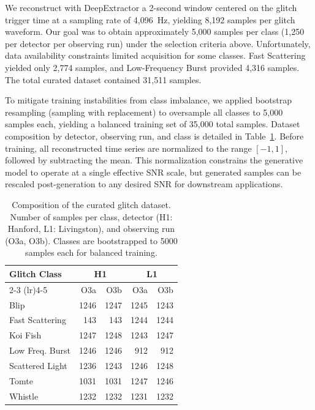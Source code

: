 \documentclass[reprint,nofootinbib,amsmath,amssymb,aps,floatfix]{revtex4-2}
\begin{document}
We reconstruct with DeepExtractor a 2-second window centered on the glitch trigger time at a sampling rate of 4,096~Hz, yielding 8,192 samples per glitch waveform.
Our goal was to obtain approximately 5,000 samples per class (1,250 per detector per observing run) under the selection criteria above.
Unfortunately, data availability constraints limited acquisition for some classes.
Fast Scattering yielded only 2,774 samples, and Low-Frequency Burst provided 4,316 samples.
The total curated dataset contained 31,511 samples.

To mitigate training instabilities from class imbalance, we applied bootstrap resampling (sampling with replacement) to oversample all classes to 5,000 samples each, yielding a balanced training set of 35,000 total samples.
Dataset composition by detector, observing run, and class is detailed in Table~\ref{tab:glitch_pivot_summary}.
Before training, all reconstructed time series are normalized to the range $[-1, 1]$, followed by subtracting the mean.
This normalization constrains the generative model to operate at a single effective SNR scale, but generated samples can be rescaled post-generation to any desired SNR for downstream applications.

\begin{table}[ht]
    \centering
    \caption{Composition of the curated glitch dataset. Number of samples per class, detector (H1: Hanford, L1: Livingston), and observing run (O3a, O3b). Classes are bootstrapped to 5000 samples each for balanced training.}
    \label{tab:glitch_pivot_summary}
    \begin{tabular}{l rrrr}
    \toprule
    \multirow{2}{*}{Glitch Class} & \multicolumn{2}{c}{H1} & \multicolumn{2}{c}{L1} \\
    \cmidrule(lr){2-3} \cmidrule(lr){4-5}
    & O3a   & O3b   & O3a   & O3b   \\
    \midrule
    Blip                  & 1246 & 1247 & 1245 & 1243 \\
    Fast Scattering      & 143  & 143  & 1244 & 1244 \\
    Koi Fish             & 1247 & 1248 & 1243 & 1247 \\
    Low Freq. Burst     & 1246 & 1246 & 912  & 912  \\
    Scattered Light      & 1236 & 1243 & 1246 & 1248 \\
    Tomte                 & 1031 & 1031 & 1247 & 1246 \\
    Whistle               & 1232 & 1232 & 1231 & 1232 \\
    \bottomrule
    \end{tabular}
\end{table}
\end{document}
